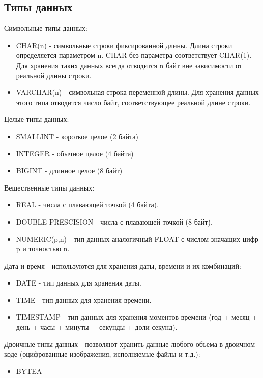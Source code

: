 \subsection{Типы данных}
Символьные типы данных:
\begin {itemize}
	\item CHAR(n) - символьные строки фиксированной длины. Длина строки определяется параметром n. CHAR без параметра соответствует CHAR(1). Для хранения таких данных всегда отводится n байт вне зависимости от реальной длины строки.
	\item VARCHAR(n) - символьная строка переменной длины. Для хранения данных этого типа отводится число байт, соответствующее реальной длине строки.
\end {itemize}

Целые типы данных:
\begin {itemize}
	\item SMALLINT - короткое целое (2 байта)
	\item INTEGER - обычное целое (4 байта) 
	\item BIGINT - длинное целое (8 байт) 
\end {itemize}

Вещественные типы данных:
\begin {itemize}
	\item REAL - числа с плавающей точкой (4 байта).
	\item DOUBLE PRESCISION - числа с плавающей точкой (8 байт).
	\item NUMERIC(p,n) - тип данных аналогичный FLOAT с числом значащих цифр p и точностью n.
\end {itemize}

Дата и время - используются для хранения даты, времени и их комбинаций:
\begin {itemize}
	\item DATE - тип данных для хранения даты.
	\item TIME - тип данных для хранения времени.
	\item TIMESTAMP - тип данных для хранения моментов времени (год + месяц + день + часы + минуты + секунды + доли секунд).
\end {itemize}

Двоичные типы данных - позволяют хранить данные любого объема в двоичном коде (оцифрованные изображения, исполняемые файлы и т.д.):
\begin {itemize}
	\item BYTEA
\end {itemize}

